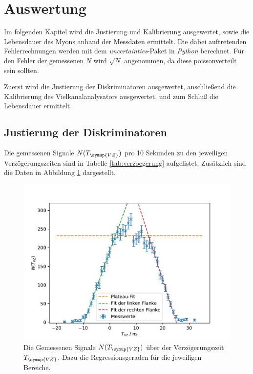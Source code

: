 \section{Auswertung}
\label{sec:Auswertung}

Im folgenden Kapitel wird die Justierung und Kalibrierung ausgewertet, sowie die
Lebensdauer des Myons anhand der Messdaten ermittelt. Die dabei auftretenden Fehlerrechnungen
werden mit dem \textit{uncertainties}-Paket in \textit{Python} berechnet. Für den Fehler der gemessenen $N$ wird
$\sqrt{N}$ angenommen, da diese poissonverteilt sein sollten.

\noindent
Zuerst wird die Justierung der Diskriminatoren ausgewertet, anschließend die
Kalibrierung des Vielkanalanalysators ausgewertet, und zum Schluß die Lebensdauer
ermittelt.

\subsection{Justierung der Diskriminatoren}
\label{sec:Verzögerungszeit}

Die gemessenen Signale $N(T_{\symup{VZ}})$ pro 10 Sekunden zu den jeweiligen Verzögerungszeiten sind in
Tabelle \ref{tab:verzoegerung} aufgelistet. Zusätzlich sind die Daten in Abbildung \ref{fig:verzoegerung}
dargestellt.

\begin{figure}[h]
  \centering
  \includegraphics{verzoegerungregression.pdf}
  \caption{Die Gemessenen Signale $N(T_{\symup{VZ}})$ über der Verzögerungszeit $T_{\symup{VZ}}$. Dazu die Regressionsgeraden für die jeweiligen Bereiche.}
  \label{fig:verzoegerung}
\end{figure}

